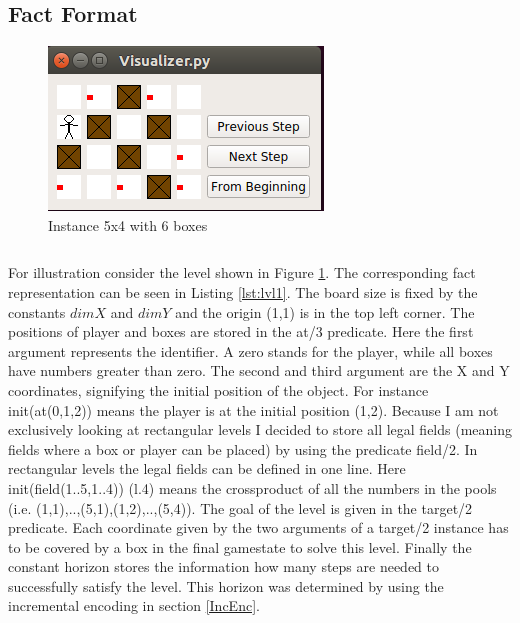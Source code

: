 \documentclass[12pt,a4paper,oneside]{report}
\begin{document}
\subsection{Fact Format}
\begin{figure}[ht]
\centering
\includegraphics{Visualizer}
\caption{Instance 5x4 with 6 boxes}
\label{fig:levelVis}
\end{figure}

\begin{lstlisting}[caption={Fact Format of my third level},label=lst:lvl1]
\end{lstlisting}
For illustration consider the level shown in Figure \ref{fig:levelVis}. The corresponding fact representation can be seen in Listing \ref{lst:lvl1}. The board size is fixed by the constants $dimX$ and $dimY$ and the origin (1,1) is in the top left corner. The positions of player and boxes are stored in the at/3 predicate. Here the first argument represents the identifier. A zero stands for the player, while all boxes have numbers greater than zero. The second and third argument are the X and Y coordinates, signifying the initial position of the object. For instance init(at(0,1,2)) means the player is at the initial position (1,2). Because I am not exclusively looking at rectangular levels I decided to store all legal fields (meaning fields where a box or player can be placed) by using the predicate field/2. In rectangular levels the legal fields can be defined in one line. Here init(field(1..5,1..4)) (l.4) means the crossproduct of all the numbers in the pools (i.e. (1,1),..,(5,1),(1,2),..,(5,4)).
The goal of the level is given in the target/2 predicate. Each coordinate given by the two arguments of a target/2 instance has to be covered by a box in the final gamestate to solve this level.
Finally the constant horizon stores the information how many steps are needed to successfully satisfy the level. This horizon was determined by using the incremental encoding in section \ref{IncEnc}.
\end{document}
